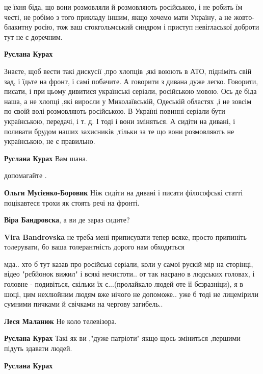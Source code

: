 \begin{itemize}
\begin{itemize}
це їхня біда, що вони розмовляли й розмовляють російською, і не робить їм
честі, не робімо з того прикладу іншим, якщо хочемо мати Україну, а не
жовто-блакитну росію, тож ваш стокгольмський синдром і приступ невігласької
доброти тут не є доречним.

\textbf{Руслана Курах} 

Знаєте, щоб вести такі дискусії ,про хлопців ,які воюють в АТО, підніміть свій
зад, і їдьте на фронт, і самі побачите. А говорити з дивана дуже легко.
Говорити, писати, і при цьому дивитися українські серіали, російською мовою. Ось
де біда наша, а не хлопці ,які виросли у Миколаївській, Одеській областях ,і не
зовсім по своїй волі розмовляють російською. В Україні повинні серіали бути
українською, передачі, і т. д. І тоді і вони зміняться. А сидіти на дивані, і
поливати брудом наших захисників ,тільки за те що вони розмовляють не
українською, не є правильно.

\textbf{Руслана Курах} Вам шана.

допомагайте .

\textbf{Ольги Мусієнко-Боровик} Ніж сидіти на дивані і писати філософські статті поцікавтеся трохи як стоять речі на фронті.

\textbf{Віра Бандровска}, а ви де зараз сидите?

\textbf{Vira Bandrovska} не треба мені приписувати тепер всяке, просто припиніть толерувати, бо ваша толерантність дорого нам обходиться


мда.. хто б тут казав про російські серіали, коли у самої рускій мір на
сторінці, відео "рєбйонок вижил" і всякі нечистоти.. от так насрано в людських
головах, і головне - подивіться, скільки їх є...(пролайкало людей оте її
бєзразніци), я в шоці, цим нехлюйним людям вже нічого не допоможе.. уже б тоді
не лицемірили сумними пичками й свічками на чергову загибель..

\textbf{Леся Маланюк} Не коло телевізора.

\textbf{Руслана Курах} Такі як ви ,"дуже патріоти" якщо щось зміниться ,першими підуть здавати людей.


\textbf{Руслана Курах} 


\end{itemize}
\end{itemize}
